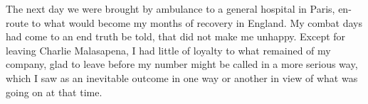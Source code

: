\documentclass[../m3y]{subfiles}
\begin{document}
The next day we were brought by ambulance to a general hospital in Paris, en-route to what would become my months of recovery in England. My combat days had come to an end truth be told, that did not make me unhappy. Except for leaving Charlie Malasapena, I had little of loyalty to what remained of my company, glad to leave before my number might be called in a more serious way, which I saw as an inevitable outcome in one way or another in view of what was going on at that time.
\end{document}
